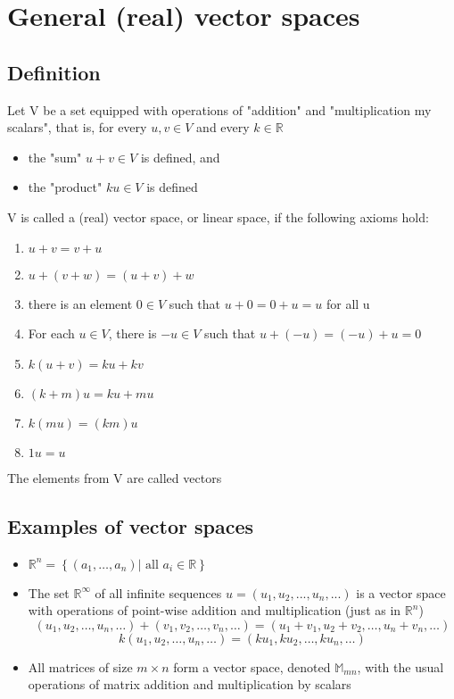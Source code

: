 \documentclass{article}[18pt]
\begin{document}
\section{General (real) vector spaces }
\subsection{Definition}
Let V be a set equipped with operations of "addition" and "multiplication my scalars", that is, for every $u,v\in V$ and every $k\in \mathbb{ R }$
\begin{itemize}
	\item the "sum" $u+v\in V$ is defined, and
	\item the "product" $ku\in V$ is defined
\end{itemize}
V is called a (real) vector space, or linear space, if the following axioms hold:
\begin{enumerate}
	\item $u+v=v+u$
	\item $u+(v+w)=(u+v)+w$
	\item there is an element $0\in V$ such that $u+0=0+u=u$ for all u
	\item For each $u\in V$, there is $-u\in V$ such that $u+(-u)=(-u)+u=0$
	\item $k(u+v)=ku+kv$
	\item $(k+m)u=ku+mu$
	\item $k(mu)=(km)u$
	\item $1u=u$
\end{enumerate}
The elements from V are called vectors
\subsection{Examples of vector spaces}
\begin{itemize}
	\item $\mathbb { R } ^ { n } = \left\{ \left( a _ { 1 } , \ldots , a _ { n } \right) | \text { all } a _ { i } \in \mathbb { R } \right\}$
	\item The set $\mathbb{ R }^\infty$ of all infinite sequences $u=(u_1,u_2,...,u_n,...)$ is a vector space with operations of point-wise addition and multiplication (just as in $\mathbb{ R }^n$)
	$$\left( u _ { 1 } , u _ { 2 } , \ldots , u _ { n } , \ldots \right) + \left( v _ { 1 } , v _ { 2 } , \ldots , v _ { n } , \ldots \right) = \left( u _ { 1 } + v _ { 1 } , u _ { 2 } + v _ { 2 } , \ldots , u _ { n } + v _ { n } , \ldots \right)$$
	$$k \left( u _ { 1 } , u _ { 2 } , \ldots , u _ { n } , \ldots \right) = \left( k u _ { 1 } , k u _ { 2 } , \ldots , k u _ { n } , \ldots \right)$$
	\item All matrices of size $m\times n$ form a vector space, denoted $\mathbb{M}_{mn}$, with the usual operations of matrix addition and multiplication by scalars
\end{itemize}
\end{document}
